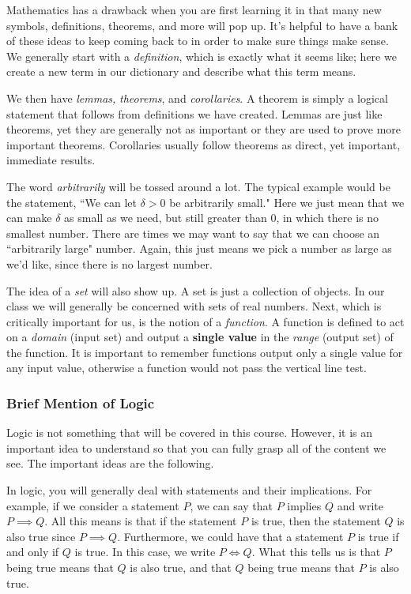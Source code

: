 \documentclass[leqno]{article}
\theoremstyle{definition}
\theoremstyle{remark}
\theoremstyle{theorem}
\begin{document}
Mathematics has a drawback when you are first learning it in that many new symbols, definitions, theorems, and more will pop up.  It's helpful to have a bank of these ideas to keep coming back to in order to make sure things make sense.  We generally start with a \emph{definition}, which is exactly what it seems like; here we create a new term in our dictionary and describe what this term means.  

We then have \emph{lemmas,} \emph{theorems}, and \emph{corollaries}. A theorem is simply a logical statement that follows from definitions we have created.  Lemmas are just like theorems, yet they are generally not as important or they are used to prove more important theorems. Corollaries usually follow theorems as direct, yet important, immediate results.

The word \emph{arbitrarily} will be tossed around a lot.  The typical example would be the statement, ``We can let $\delta>0$ be arbitrarily small." Here we just mean that we can make $\delta$ as small as we need, but still greater than $0$, in which there is no smallest number. There are times we may want to say that we can choose an ``arbitrarily large" number.  Again, this just means we pick a number as large as we'd like, since there is no largest number.

The idea of a \emph{set} will also show up.  A set is just a collection of objects.  In our class we will generally be concerned with sets of real numbers. Next, which is critically important for us, is the notion of a \emph{function}.  A function is defined to act on a \emph{domain} (input set) and output a \textbf{single value} in the \emph{range} (output set) of the function. It is important to remember functions output only a single value for any input value, otherwise a function would not pass the vertical line test.

\subsubsection{Brief Mention of Logic}

Logic is not something that will be covered in this course.  However, it is an important idea to understand so that you can fully grasp all of the content we see.  The important ideas are the following.

In logic, you will generally deal with statements and their implications.  For example, if we consider a statement $P$, we can say that $P$ implies $Q$ and write $P\implies Q$.  All this means is that if the statement $P$ is true, then the statement $Q$ is also true since $P\implies Q$.  Furthermore, we could have that a statement $P$ is true if and only if $Q$ is true.  In this case, we write $P\iff Q$.  What this tells us is that $P$ being true means that $Q$ is also true, and that $Q$ being true means that $P$ is also true.  
\end{document}
